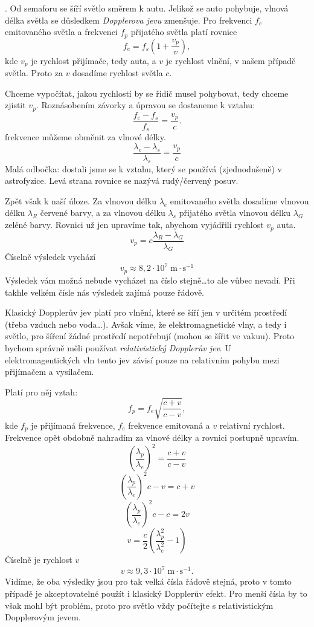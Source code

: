 \documentclass{../../../../style/mkimain}
\begin{document}
\noindent{}
.
\klein
Od semaforu se šíří světlo směrem k autu. Jelikož se auto pohybuje, vlnová délka světla se důsledkem \emph{Dopplerova jevu} zmenšuje.
Pro frekvenci $f_e$ emitovaného světla a frekvenci $f_p$ přijatého světla platí rovnice
$$f_e=f_s\left(1+\frac{v_p}{v}\right),$$
kde $v_p$ je rychlost přijímače, tedy auta, a $v$ je rychlost vlnění, v našem případě světla.
Proto za $v$ dosadíme rychlost světla $c$.

Chceme vypočítat, jakou rychlostí by se řidič musel pohybovat, tedy chceme zjistit $v_p$.
Roznásobením závorky a úpravou se dostaneme k vztahu:
$$\frac{f_e-f_s}{f_s}=\frac{v_p}{c}.$$
frekvence můžeme obměnit za vlnové délky.
$$\frac{\lambda_e-\lambda_s}{\lambda_s}=\frac{v_p}{c}$$
Malá odbočka: dostali jsme se k vztahu, který se používá (zjednodušeně) v astrofyzice. Levá strana rovnice se nazývá rudý/červený posuv.

Zpět však k naší úloze.
Za vlnovou délku $\lambda_e$ emitovaného světla dosadíme vlnovou délku $\lambda_R$ červené barvy, a za vlnovou délku $\lambda_s$ přijatého světla vlnovou délku $\lambda_G$ zeléné barvy. 
Rovnici už jen upravíme tak, abychom vyjádřili rychlost $v_p$ auta.
$${v_p}=c\frac{\lambda_R-\lambda_G}{\lambda_G}$$
Číselně výsledek vychází
$$v_p\approx8,2\cdot10^7\;\mathrm{m\cdot s^{-1}}$$
Výsledek vám možná nebude vycházet na číslo stejně\dots to ale vůbec nevadí. Při takhle velkém čísle nás výsledek zajímá pouze řádově.

Klasický Dopplerův jev platí pro vlnění, které se šíří jen v určitém prostředí (třeba vzduch nebo voda\dots).
Avšak víme, že elektromagnetické vlny, a tedy i světlo, pro šíření žádné prostředí nepotřebují (mohou se šířit ve vakuu).
Proto bychom správně měli používat \textit{relativistický Dopplerův jev}.
U elektromagentických vln tento jev závisí pouze na relativním pohybu mezi přijímačem a vysílačem.

\noindent
Platí pro něj vztah:
$$f_p=f_e\sqrt{\frac{c+v}{c-v}},$$
kde $f_p$ je přijímaná frekvence, $f_e$ frekvence emitovaná a $v$ relativní rychlost.
Frekvence opět obdobně nahradím za vlnové délky a rovnici postupně upravím.
$$\left(\frac{\lambda_p}{\lambda_e}\right)^2=\frac{c+v}{c-v}$$
$$\left(\frac{\lambda_p}{\lambda_e}\right)^2{c-v}={c+v}$$
$$\left(\frac{\lambda_p}{\lambda_e}\right)^2c-c=2v$$
$$v=\frac{c}{2}\left(\frac{\lambda_p^2}{\lambda_e^2}-1\right)$$
Číselně je rychlost $v$
$$v\approx9,3\cdot10^7\;\mathrm{m\cdot s^{-1}}.$$
Vidíme, že oba výsledky jsou pro tak velká čísla řádově stejná, proto v tomto případě je akceptovatelné použít i klasický Dopplerův efekt.
Pro menší čísla by to však mohl být problém, proto pro světlo vždy počítejte s relativistickým Dopplerovým jevem.
\end{document}

